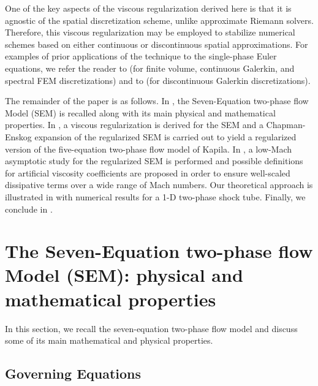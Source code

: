 \documentclass[preprint,10pt]{elsarticle}
\begin{document}
One of the key aspects of the viscous regularization derived here is that it is agnostic of the spatial discretization scheme, unlike approximate 
Riemann solvers. Therefore, this viscous regularization may be employed to stabilize numerical schemes based on either continuous or discontinuous 
spatial approximations. For examples of prior applications of the technique to the single-phase Euler equations, we refer the reader to \cite{jlg, Marco_paper_low_mach} 
(for finite volume, continuous Galerkin, and spectral FEM discretizations) and to \cite{valentin} (for discontinuous Galerkin discretizations). 

The remainder of the paper is as follows. In , the Seven-Equation two-phase flow Model (SEM) is recalled along with its main 
physical and mathematical properties. In , a viscous regularization is derived for the SEM and a Chapman-Enskog expansion of the 
regularized SEM is carried out to yield a regularized version of the five-equation two-phase flow model of Kapila. In , a low-Mach 
asymptotic study for the regularized SEM is performed and possible definitions for artificial viscosity coefficients are proposed in order to ensure 
well-scaled dissipative terms over a wide range of Mach numbers. Our theoretical approach is illustrated in  with numerical results 
for a 1-D two-phase shock tube. 
Finally, we conclude in .
%
\section{The Seven-Equation two-phase flow Model (SEM): physical and mathematical properties}\label{sec:7-equ-model}
%
In this section, we recall the seven-equation two-phase flow model and discuss some of its main mathematical and physical properties.
%
\subsection{Governing Equations}
\end{document}
